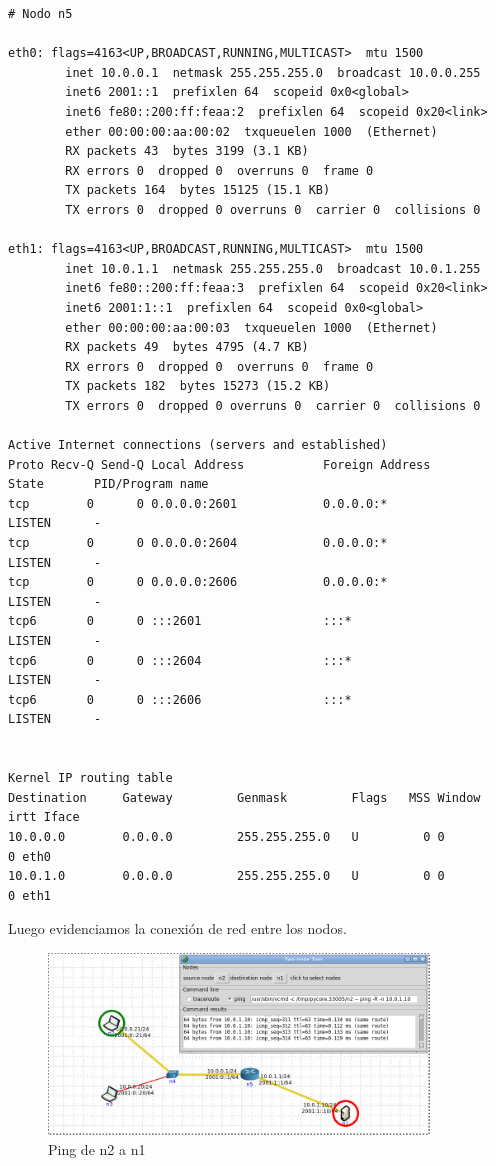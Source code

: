 \begin{lstlisting}
# Nodo n5

eth0: flags=4163<UP,BROADCAST,RUNNING,MULTICAST>  mtu 1500
        inet 10.0.0.1  netmask 255.255.255.0  broadcast 10.0.0.255
        inet6 2001::1  prefixlen 64  scopeid 0x0<global>
        inet6 fe80::200:ff:feaa:2  prefixlen 64  scopeid 0x20<link>
        ether 00:00:00:aa:00:02  txqueuelen 1000  (Ethernet)
        RX packets 43  bytes 3199 (3.1 KB)
        RX errors 0  dropped 0  overruns 0  frame 0
        TX packets 164  bytes 15125 (15.1 KB)
        TX errors 0  dropped 0 overruns 0  carrier 0  collisions 0

eth1: flags=4163<UP,BROADCAST,RUNNING,MULTICAST>  mtu 1500
        inet 10.0.1.1  netmask 255.255.255.0  broadcast 10.0.1.255
        inet6 fe80::200:ff:feaa:3  prefixlen 64  scopeid 0x20<link>
        inet6 2001:1::1  prefixlen 64  scopeid 0x0<global>
        ether 00:00:00:aa:00:03  txqueuelen 1000  (Ethernet)
        RX packets 49  bytes 4795 (4.7 KB)
        RX errors 0  dropped 0  overruns 0  frame 0
        TX packets 182  bytes 15273 (15.2 KB)
        TX errors 0  dropped 0 overruns 0  carrier 0  collisions 0

Active Internet connections (servers and established)
Proto Recv-Q Send-Q Local Address           Foreign Address         State       PID/Program name    
tcp        0      0 0.0.0.0:2601            0.0.0.0:*               LISTEN      -                   
tcp        0      0 0.0.0.0:2604            0.0.0.0:*               LISTEN      -                   
tcp        0      0 0.0.0.0:2606            0.0.0.0:*               LISTEN      -                   
tcp6       0      0 :::2601                 :::*                    LISTEN      -                   
tcp6       0      0 :::2604                 :::*                    LISTEN      -                   
tcp6       0      0 :::2606                 :::*                    LISTEN      -  


Kernel IP routing table
Destination     Gateway         Genmask         Flags   MSS Window  irtt Iface
10.0.0.0        0.0.0.0         255.255.255.0   U         0 0          0 eth0
10.0.1.0        0.0.0.0         255.255.255.0   U         0 0          0 eth1

\end{lstlisting}
\endgroup

Luego evidenciamos la conexión de red entre los nodos.

\begin{figure}[!ht]
   \centering
   \includegraphics[width=0.9\textwidth]{img/ping-n2-n1}
   \caption{Ping de n2 a n1}
   \centering
   \label{label:file_name}
\end{figure}

